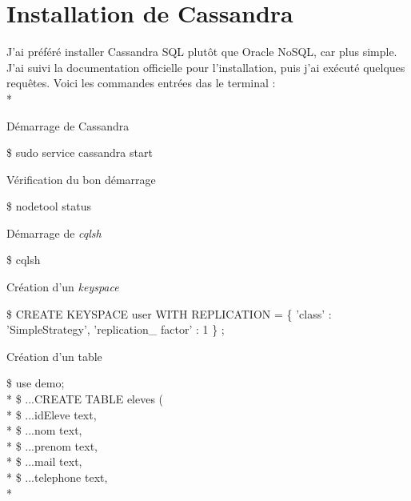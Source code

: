 \documentclass{article}
\begin{document}

\section{Installation de Cassandra}

J'ai pr\'{e}f\'{e}r\'{e} installer Cassandra SQL plut\^{o}t que Oracle NoSQL, car plus simple. J'ai suivi la documentation officielle pour l'installation, puis j'ai ex\'{e}cut\'{e} quelques requ\^{e}tes. Voici les commandes entr\'{e}es das le terminal : \\*

\begin{enumerate}
\begin{item}
D\'{e}marrage de Cassandra
\begin{tcolorbox}
\$ sudo service cassandra start
\end{tcolorbox}
\end{item}
\begin{item}
V\'{e}rification du bon d\'{e}marrage
\begin{tcolorbox}
\$ nodetool status
\end{tcolorbox}
\end{item}
\begin{item}
D\'{e}marrage de \textit{cqlsh}
\begin{tcolorbox}
\$ cqlsh
\end{tcolorbox}
\end{item}
\begin{item}
Cr\'{e}ation d'un \textit{keyspace}
\begin{tcolorbox}
\$ CREATE KEYSPACE user WITH REPLICATION = \{ 'class' : 'SimpleStrategy', 'replication\_ factor' : 1 \} ;
\end{tcolorbox}
\end{item}
\begin{item}
Cr\'{e}ation d'un table
\begin{tcolorbox}
\$ use demo; \\*
\$ ...CREATE TABLE eleves ( \\*
\$ ...idEleve text, \\*
\$ ...nom text, \\*
\$ ...prenom text, \\*
\$ ...mail text, \\*
\$ ...telephone text, \\*

\end{tcolorbox}
\end{item}
\end{enumerate}
\end{document}
